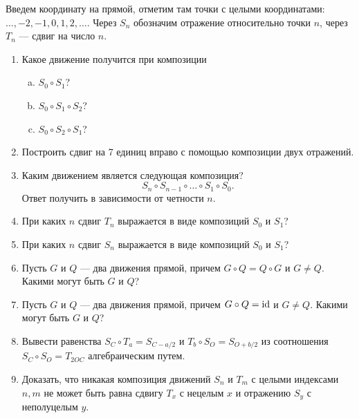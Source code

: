 Введем координату на прямой, отметим там точки с целыми координатами: $\dots,-2,-1,0,1,2,\dots$. Через $S_n$ обозначим отражение относительно точки $n$, через $T_n$ --- сдвиг на число $n$.
\begin{enumerate}
\item Какое движение получится при композиции
\begin{enumerate}[a)]
\item $S_0\circ S_1$?
\item $S_0\circ S_1\circ S_2$?
\item $S_0\circ S_2\circ S_1$?
\end{enumerate}
\item Построить сдвиг на 7 единиц вправо с помощью композиции двух отражений.
\item Каким движением является следующая композиция?
$$
S_{n}\circ S_{n-1}\circ \dots\circ S_{1}\circ S_0.
$$
Ответ получить в зависимости от четности $n$.
\item При каких $n$ сдвиг $T_n$ выражается в виде композиций $S_0$ и $S_1$?
\item При каких $n$ сдвиг $S_n$ выражается в виде композиций $S_0$ и $S_1$?
\item Пусть $G$ и $Q$ --- два движения прямой, причем $G\circ Q=Q\circ G$ и $G\ne Q$. Какими могут быть $G$ и $Q$?
\item Пусть $G$ и $Q$ --- два движения прямой, причем $G\circ Q=\mathrm{id}$ и $G\ne Q$. Какими могут быть $G$ и $Q$?
\item Вывести равенства $S_C\circ T_a = S_{C-a/2}$ и $T_b\circ S_O = S_{O+b/2}$ из соотношения $S_C\circ S_O=T_{2OC}$ алгебраическим путем.
\item Доказать, что никакая композиция движений $S_n$ и $T_m$ с целыми индексами $n,m$ не может быть равна сдвигу $T_x$ с нецелым $x$ и отражению $S_y$ с неполуцелым $y$.
\end{enumerate}

